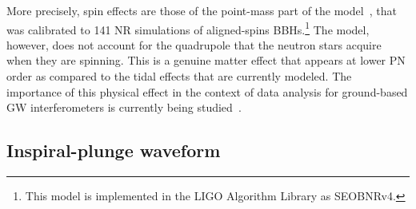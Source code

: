 \documentclass[prd,aps,letter,twocolumn,floatfix,notitlepage,nofootinbib]{revtex4-1}
\newcommand{\red}[1]{\textcolor{red}{#1}}
\newcommand{\blue}[1]{\textcolor{blue}{#1}}
\begin{document}

More precisely, spin effects are those of the point-mass part of the model~\cite{Bohe:2016gbl}, that was calibrated to 141 NR simulations of aligned-spins BBHs.\footnote{This model is implemented in the LIGO Algorithm Library as SEOBNRv4.} The model, however, does not account for the quadrupole that the neutron stars acquire when they are spinning. This is a genuine matter effect that appears at lower PN order as compared to the tidal effects that are currently modeled. The importance of this physical effect in the context of data analysis for ground-based GW interferometers is currently being studied~\cite{IanTanja}.

\subsection{Inspiral-plunge waveform}
\end{document}
